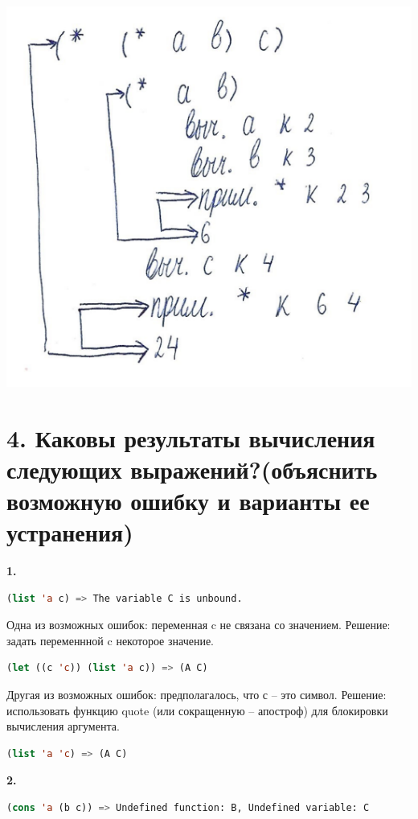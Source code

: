 \documentclass[12pt]{report}
\begin{document}
\includegraphics[scale=1]{img/3}

\section*{4. Каковы результаты вычисления следующих выражений?(объяснить возможную ошибку и варианты ее устранения)}

\textbf{1.}
 
\begin{lstlisting}[language=Lisp]
(list 'a c) => The variable C is unbound.
\end{lstlisting}

Одна из возможных ошибок: переменная c не связана со значением. Решение: задать переменнной c некоторое значение.
\begin{lstlisting}[language=Lisp]
(let ((c 'c)) (list 'a c)) => (A C)
\end{lstlisting}

Другая из возможных ошибок: предполагалось, что с -- это символ. Решение: использовать функцию quote (или сокращенную -- апостроф) для блокировки вычисления аргумента.
\begin{lstlisting}[language=Lisp]
	(list 'a 'c) => (A C)
\end{lstlisting}




\clearpage
\textbf{2.}
\begin{lstlisting}[language=Lisp]
	 (cons 'a (b c)) => Undefined function: B, Undefined variable: C
\end{lstlisting}
\end{document}
